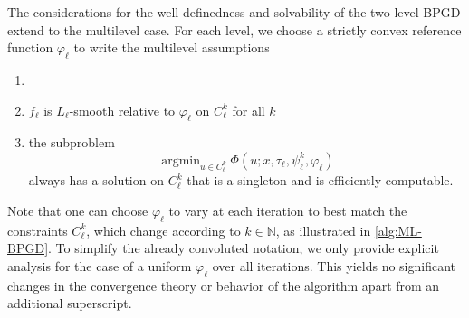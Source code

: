 \documentclass[11pt,reqno]{amsart}
\numberwithin{equation}{section}
\numberwithin{figure}{section}
\theoremstyle{plain}
\theoremstyle{definition}
\newenvironment{assumptionp}[1]{
  \renewcommand\theassumptionalt{#1}
  \assumptionalt
}{\endassumptionalt}
\newcommand{\N}{\mathbb{N}}
\newcommand{\vphi}{\varphi}
\DeclareMathOperator*{\argmin}{arg min}
\begin{document}
The considerations for the well-definedness and solvability of the two-level BPGD extend to the multilevel case. For each level, we choose a strictly convex reference function $\vphi_\ell$ to write the multilevel assumptions
\begin{assumptionp}{D}\label{assump:solvability-coarse-ml}
    \begin{enumerate}
    \item[~] 
    \item $f_\ell$ is $L_\ell$-smooth relative to $\vphi_\ell$ on $C_\ell^k$ for all $k$
    \item the subproblem
    \begin{equation}
        \argmin_{u \in C_\ell^k} \Phi(u; x, \tau_\ell, \psi_{\ell}^k, \vphi_\ell)
    \end{equation}
    always has a solution on $C_\ell^k$ that is a singleton and is efficiently computable.
\end{enumerate}
\end{assumptionp}
Note that one can choose $\vphi_\ell$ to vary at each iteration to best match the constraints $C_\ell^k$, which change according to $k \in \N$, as illustrated in \cref{alg:ML-BPGD}. To simplify the already convoluted notation, we only provide explicit analysis for the case of a uniform $\vphi_\ell$ over all iterations. This yields no significant changes in the convergence theory or behavior of the algorithm apart from an additional superscript.
        
\end{document}

